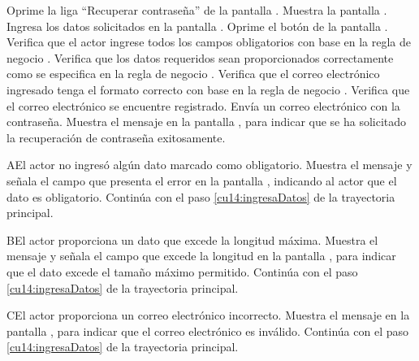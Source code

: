  \begin{UCtrayectoria}
    \UCpaso[\UCactor] Oprime la liga ``Recuperar contraseña'' de la pantalla .
    \UCpaso[\UCsist] Muestra la pantalla .
    \UCpaso[\UCactor] Ingresa los datos solicitados en la pantalla  . \label{cu14:ingresaDatos}
	\UCpaso[\UCactor] Oprime el botón  de la pantalla .
    \UCpaso[\UCsist] Verifica que el actor ingrese todos los campos obligatorios con base en la regla de negocio  . 
    \UCpaso[\UCsist] Verifica que los datos requeridos sean proporcionados correctamente como se especifica en la regla de negocio . 
    \UCpaso[\UCsist] Verifica que el correo electrónico ingresado tenga el formato correcto con base en la regla de negocio . 
    \UCpaso[\UCsist] Verifica que el correo electrónico se encuentre registrado. 
    \UCpaso[\UCsist] Envía un correo electrónico con la contraseña.
    \UCpaso[\UCactor] Muestra el mensaje  en la pantalla , para indicar que se ha solicitado la recuperación de contraseña exitosamente.
 \end{UCtrayectoria}
 
  
 \begin{UCtrayectoriaA}{A}{El actor no ingresó algún dato marcado como obligatorio.}
    \UCpaso[\UCsist] Muestra el mensaje  y señala el campo que presenta el error en la pantalla 
	    , indicando al actor que el dato es obligatorio.
    \UCpaso[] Continúa con el paso \ref{cu14:ingresaDatos} de la trayectoria principal.
 \end{UCtrayectoriaA}
 \begin{UCtrayectoriaA}{B}{El actor proporciona un dato que excede la longitud máxima.}
    \UCpaso[\UCsist] Muestra el mensaje  y señala el campo que excede la 
    longitud en la pantalla , para indicar que el dato excede el tamaño máximo permitido.
    \UCpaso[] Continúa con el paso \ref{cu14:ingresaDatos} de la trayectoria principal.
 \end{UCtrayectoriaA}
 \begin{UCtrayectoriaA}{C}{El actor proporciona un correo electrónico incorrecto.}
    \UCpaso[\UCsist] Muestra el mensaje  en la pantalla , para indicar que el correo electrónico es inválido.
    \UCpaso[] Continúa con el paso \ref{cu14:ingresaDatos} de la trayectoria principal.
 \end{UCtrayectoriaA}
 